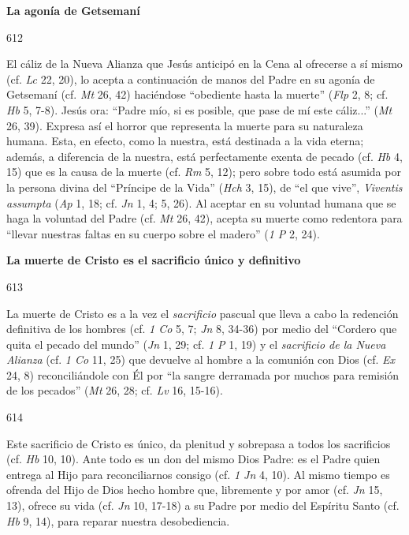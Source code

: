 			\begin{ccebody}\textbf{La agonía de Getsemaní}\end{ccebody}
			
			\begin{ccebody}\begin{ccenumber}612\end{ccenumber} El cáliz de la Nueva Alianza que Jesús anticipó en la Cena al ofrecerse a sí mismo (cf. \textit{Lc} 22, 20), lo acepta a continuación de manos del Padre en su agonía de Getsemaní (cf. \textit{Mt} 26, 42) haciéndose “obediente hasta la muerte” (\textit{Flp} 2, 8; cf. \textit{Hb} 5, 7-8). Jesús ora: “Padre mío, si es posible, que pase de mí este cáliz...” (\textit{Mt} 26, 39). Expresa así el horror que representa la muerte para su naturaleza humana. Esta, en efecto, como la nuestra, está destinada a la vida eterna; además, a diferencia de la nuestra, está perfectamente exenta de pecado (cf. \textit{Hb} 4, 15) que es la causa de la muerte (cf. \textit{Rm} 5, 12); pero sobre todo está asumida por la persona divina del “Príncipe de la Vida” (\textit{Hch} 3, 15), de “el que vive”, \textit{Viventis assumpta} (\textit{Ap} 1, 18; cf. \textit{Jn} 1, 4; 5, 26). Al aceptar en su voluntad humana que se haga la voluntad del Padre (cf. \textit{Mt} 26, 42), acepta su muerte como redentora para “llevar nuestras faltas en su cuerpo sobre el madero” (\textit{1 P} 2, 24).\end{ccebody}
			
			\begin{ccebody}\textbf{La muerte de Cristo es el sacrificio único y definitivo}\end{ccebody}
			
			\begin{ccebody}\begin{ccenumber}613\end{ccenumber} La muerte de Cristo es a la vez el \textit{sacrificio} pascual que lleva a cabo la redención definitiva de los hombres (cf. \textit{1 Co} 5, 7; \textit{Jn} 8, 34-36) por medio del “Cordero que quita el pecado del mundo” (\textit{Jn} 1, 29; cf. \textit{1 P} 1, 19) y el \textit{sacrificio de la Nueva Alianza} (cf. \textit{1 Co} 11, 25) que devuelve al hombre a la comunión con Dios (cf. \textit{Ex} 24, 8) reconciliándole con Él por “la sangre derramada por muchos para remisión de los pecados” (\textit{Mt} 26, 28; cf. \textit{Lv} 16, 15-16).\end{ccebody}
			
			\begin{ccebody}\begin{ccenumber}614\end{ccenumber} Este sacrificio de Cristo es único, da plenitud y sobrepasa a todos los sacrificios (cf. \textit{Hb} 10, 10). Ante todo es un don del mismo Dios Padre: es el Padre quien entrega al Hijo para reconciliarnos consigo (cf. \textit{1 Jn} 4, 10). Al mismo tiempo es ofrenda del Hijo de Dios hecho hombre que, libremente y por amor (cf. \textit{Jn} 15, 13), ofrece su vida (cf. \textit{Jn} 10, 17-18) a su Padre por medio del Espíritu Santo (cf. \textit{Hb} 9, 14), para reparar nuestra desobediencia.\end{ccebody}
			
